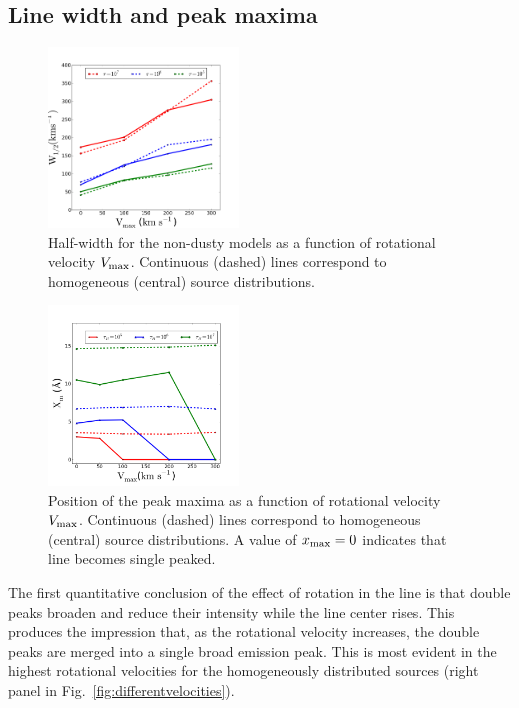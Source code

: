 \documentclass[usenatbib]{mn2e}
\newcommand{\ly}{{\ifmmode{{\rm Ly}\alpha~}\else{Ly$\alpha$~}\fi}}
\begin{document}
\subsection{Line width and peak maxima}
\label{sec:widthpeak}


\begin{figure}
    \includegraphics[width=0.45\textwidth]{WidthVvsVmax.png}
    \caption{Half-width for the non-dusty models as a function of
      rotational velocity $V_{\rm max}$. Continuous (dashed) lines
      correspond to homogeneous (central) source
      distributions. \label{fig:widthvsvelocity}} 
\end{figure}


\begin{figure}
    \includegraphics[width=0.45\textwidth]{maximumvsVmax.png}
\caption{Position of the peak maxima as a function of rotational
  velocity $V_{\rm max}$. Continuous (dashed) lines correspond to
  homogeneous (central) source distributions. A value of $x_{\rm
    max}=0$ indicates that line becomes single
  peaked. \label{fig:maximumsvsvelocity}}  
\end{figure}

The first quantitative conclusion of the effect of rotation in the
\ly line is that double peaks broaden and reduce their intensity
while the line center rises. This produces the impression that, as the
rotational velocity increases, the double peaks are merged into a
single broad emission peak. This is most evident in the highest
rotational velocities for the homogeneously distributed sources
(right panel in Fig.~\ref{fig:differentvelocities}). 
\end{document}
